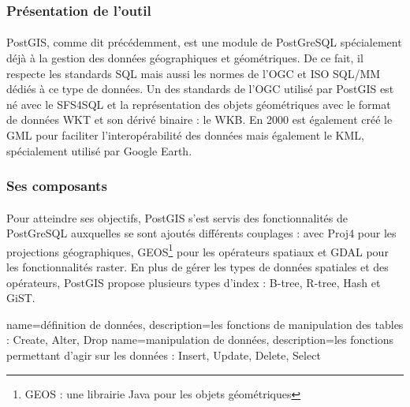 \subsubsection{Présentation de l'outil}
\paragraph{}PostGIS, comme dit précédemment, est une module de PostGreSQL spécialement déjà à la gestion des données géographiques et géométriques. De ce fait, il respecte les standards SQL mais aussi les normes de l’OGC et ISO SQL/MM \cite{sqlmm} dédiés à ce type de données. Un des standards de l’\acrshort{OGC} utilisé par PostGIS est né avec le \gls{SFS4SQL} et la représentation des objets géométriques avec le format de données  \gls{WKT} \cite{coursPostGIS} et son dérivé binaire :  le \gls{WKB}. En 2000 est également créé   le \gls{GML} pour faciliter l’interopérabilité des données mais également  le \gls{KML}, spécialement utilisé par Google Earth.

\subsubsection{Ses composants}
\paragraph{}Pour atteindre ses objectifs, PostGIS s’est servis des fonctionnalités de PostGreSQL auxquelles se sont ajoutés différents couplages : avec Proj4 pour les projections géographiques, GEOS\footnote{GEOS : une librairie Java pour les objets géométriques} pour les opérateurs spatiaux et  \gls{GDAL} pour les fonctionnalités raster. En plus de gérer les types de données spatiales et des opérateurs, PostGIS propose plusieurs types d'index : B-tree, R-tree, Hash et GiST.

{
    name=définition de données,
    description={les fonctions de manipulation des tables : Create, Alter, Drop}
}
{
    name=manipulation de données,
    description={les fonctions permettant d'agir sur les données : Insert, Update, Delete, Select}
}
